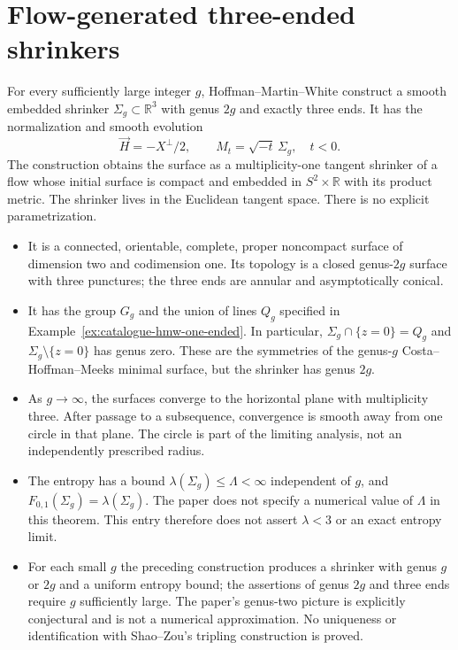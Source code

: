 \chapter{Flow-generated three-ended shrinkers}\label{sec:catalogue-hmw-three-ended}
\begin{example}\label{ex:catalogue-hmw-three-ended}
For every sufficiently large integer $g$, Hoffman--Martin--White construct a smooth embedded shrinker $\Sigma_g\subset\mathbb R^3$ with genus $2g$ and exactly three ends. It has the normalization and smooth evolution
\[
 \vec H=-X^\perp/2,\qquad M_t=\sqrt{-t}\,\Sigma_g,\quad t<0.
\]
The construction obtains the surface as a multiplicity-one tangent shrinker of a flow whose initial surface is compact and embedded in $S^2\times\mathbb R$ with its product metric. The shrinker lives in the Euclidean tangent space. There is no explicit parametrization.
\begin{itemize}
\item It is a connected, orientable, complete, proper noncompact surface of dimension two and codimension one. Its topology is a closed genus-$2g$ surface with three punctures; the three ends are annular and asymptotically conical.
\item It has the group $G_g$ and the union of lines $Q_g$ specified in Example~\ref{ex:catalogue-hmw-one-ended}. In particular, $\Sigma_g\cap\{z=0\}=Q_g$ and $\Sigma_g\setminus\{z=0\}$ has genus zero. These are the symmetries of the genus-$g$ Costa--Hoffman--Meeks minimal surface, but the shrinker has genus $2g$.
\item As $g\to\infty$, the surfaces converge to the horizontal plane with multiplicity three. After passage to a subsequence, convergence is smooth away from one circle in that plane. The circle is part of the limiting analysis, not an independently prescribed radius.
\item The entropy has a bound $\lambda(\Sigma_g)\leq\Lambda<\infty$ independent of $g$, and $F_{0,1}(\Sigma_g)=\lambda(\Sigma_g)$. The paper does not specify a numerical value of $\Lambda$ in this theorem. This entry therefore does not assert $\lambda<3$ or an exact entropy limit.
\item For each small $g$ the preceding construction produces a shrinker with genus $g$ or $2g$ and a uniform entropy bound; the assertions of genus $2g$ and three ends require $g$ sufficiently large. The paper's genus-two picture is explicitly conjectural and is not a numerical approximation. No uniqueness or identification with Shao--Zou's tripling construction is proved.

\end{itemize}
\end{example}

